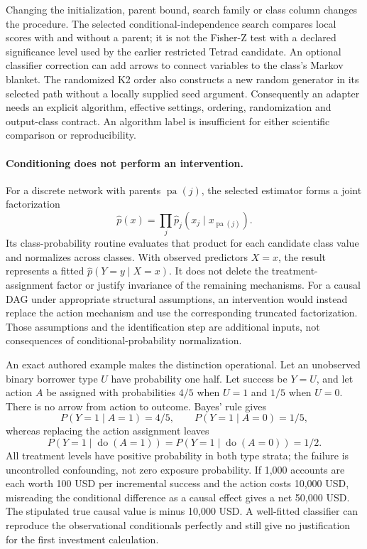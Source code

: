 Changing the initialization, parent bound, search family or class column
changes the procedure. The selected conditional-independence search compares
local scores with and without a parent; it is not the Fisher-Z test with a
declared significance level used by the earlier restricted Tetrad candidate.
An optional classifier correction can add arrows to connect variables to the
class's Markov blanket. The randomized K2 order also constructs a new random
generator in its selected path without a locally supplied seed argument.
Consequently an adapter needs an explicit algorithm, effective settings,
ordering, randomization and output-class contract. An algorithm label is
insufficient for either scientific comparison or reproducibility.
\citep{exec24_weka_source}

\paragraph{Conditioning does not perform an intervention.}
For a discrete network with parents $\operatorname{pa}(j)$, the selected
estimator forms a joint factorization
\[
 \widehat p(x)=\prod_j\widehat p_j(x_j\mid x_{\operatorname{pa}(j)}).
\]
Its class-probability routine evaluates that product for each candidate class
value and normalizes across classes. With observed predictors $X=x$, the
result represents a fitted $\widehat p(Y=y\mid X=x)$. It does not delete the
treatment-assignment factor or justify invariance of the remaining mechanisms.
For a causal DAG under appropriate structural assumptions, an intervention
would instead replace the action mechanism and use the corresponding truncated
factorization. Those assumptions and the identification step are additional
inputs, not consequences of conditional-probability normalization.
\citep{exec24_weka_source,exec24_weka_choice}

An exact authored example makes the distinction operational. Let an unobserved
binary borrower type $U$ have probability one half. Let success be $Y=U$,
and let action $A$ be assigned with probabilities $4/5$ when $U=1$ and $1/5$
when $U=0$. There is no arrow from action to outcome. Bayes' rule gives
\[
 P(Y=1\mid A=1)=4/5,\qquad P(Y=1\mid A=0)=1/5,
\]
whereas replacing the action assignment leaves
\[
 P(Y=1\mid\operatorname{do}(A=1))=
 P(Y=1\mid\operatorname{do}(A=0))=1/2.
\]
All treatment levels have positive probability in both type strata; the failure
is uncontrolled confounding, not zero exposure probability. If 1,000 accounts
are each worth 100 USD per incremental success and the action costs 10,000 USD,
misreading the conditional difference as a causal effect gives a net 50,000 USD.
The stipulated true causal value is minus 10,000 USD. A well-fitted classifier
can reproduce the observational conditionals perfectly and still give no
justification for the first investment calculation.~\citep{exec24_weka_choice}

